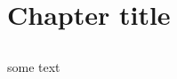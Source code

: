 \chapter{Chapter title}
    \section{}
        \subsection{}
            \subsubsection{}
    \newpage
    \section{}
    some text